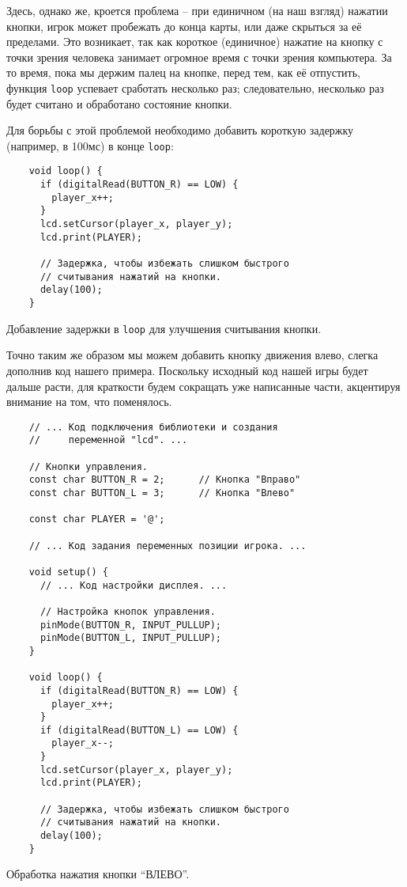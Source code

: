 \documentclass[../sparc.tex]{subfiles}
\begin{document}
Здесь, однако же, кроется проблема -- при единичном (на наш взгляд) нажатии
кнопки, игрок может пробежать до конца карты, или даже скрыться за её пределами.
Это возникает, так как короткое (единичное) нажатие на кнопку с точки зрения
человека занимает огромное время с точки зрения компьютера.  За то время, пока
мы держим палец на кнопке, перед тем, как её отпустить, функция \texttt{loop}
успевает сработать несколько раз; следовательно, несколько раз будет считано и
обработано состояние кнопки.

Для борьбы с этой проблемой необходимо добавить короткую задержку (например, в
100мс) в конце \texttt{loop}:

\begin{listing}[H]
  \begin{verbatim}
    void loop() {
      if (digitalRead(BUTTON_R) == LOW) {
        player_x++;
      }
      lcd.setCursor(player_x, player_y);
      lcd.print(PLAYER);

      // Задержка, чтобы избежать слишком быстрого
      // считывания нажатий на кнопки.
      delay(100);
    }
  \end{verbatim}
  \caption{Добавление задержки в \texttt{loop} для улучшения считывания кнопки.}
  \label{listing:game-dev-button-delay}
\end{listing}

Точно таким же образом мы можем добавить кнопку движения влево, слегка дополнив
код нашего примера.  Поскольку исходный код нашей игры будет дальше расти, для
краткости будем сокращать уже написанные части, акцентируя внимание на том, что
поменялось.

\begin{listing}[H]
  \begin{verbatim}
    // ... Код подключения библиотеки и создания
    //     переменной "lcd". ...

    // Кнопки управления.
    const char BUTTON_R = 2;      // Кнопка "Вправо"
    const char BUTTON_L = 3;      // Кнопка "Влево"

    const char PLAYER = '@';

    // ... Код задания переменных позиции игрока. ...

    void setup() {
      // ... Код настройки дисплея. ...

      // Настройка кнопок управления.
      pinMode(BUTTON_R, INPUT_PULLUP);
      pinMode(BUTTON_L, INPUT_PULLUP);
    }

    void loop() {
      if (digitalRead(BUTTON_R) == LOW) {
        player_x++;
      }
      if (digitalRead(BUTTON_L) == LOW) {
        player_x--;
      }
      lcd.setCursor(player_x, player_y);
      lcd.print(PLAYER);

      // Задержка, чтобы избежать слишком быстрого
      // считывания нажатий на кнопки.
      delay(100);
    }
  \end{verbatim}
  \caption{Обработка нажатия кнопки ``ВЛЕВО''.}
  \label{listing:game-dev-button-left}
\end{listing}
\end{document}
